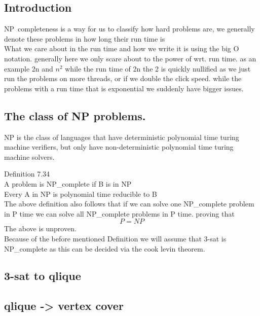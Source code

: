 \documentclass[a4paper,10pt,titlepage]{report}
\begin{document}
\subsection{Introduction}
NP\ completeness is a way for us to classify how hard problems are, we generally denote these problems in how long their run time is\\

What we care about in the run time and how we write it is using the big O notation. generally here we only scare about to the power of wrt. run time. as an example 2n and $n^2$ while the run time of 2n the 2 is quickly nullified as we just run the problems on more threads, or if we double the click speed. while the problems with a run time that is exponential we suddenly have bigger issues. 

\subsection{The class of NP problems.}
NP is the class of languages that have deterministic polynomial time turing machine verifiers, but only have non-deterministic polynomial time turing machine solvers.

Definition 7.34\\
A problem is NP\_complete if B is in NP\\
Every A in NP is polynomial time reducible to B\\

The above definition also follows that if we can solve one NP\_complete problem in P time we can solve all NP\_complete problems in P time. proving that\\
\begin{equation}
P = NP
\end{equation}
The above is unproven. \\

Because of the before mentioned Definition we will assume that 3-sat is NP\_complete as this can be decided via the cook levin theorem.\\

\subsection{3-sat to qlique}

\subsection{qlique -> vertex cover}
\end{document}
